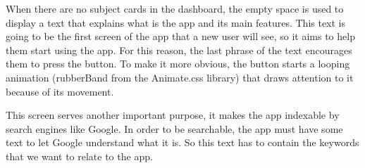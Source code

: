 When there are no subject cards in the dashboard, the empty space is used to display a text that explains what is the app and its main features. This text is going to be the first screen of the app that a new user will see, so it aims to help them start using the app. For this reason, the last phrase of the text encourages them to press the  button. To make it more obvious, the  button starts a looping animation (rubberBand from the Animate.css\cite{animate-css} library) that draws attention to it because of its movement.

This screen serves another important purpose, it makes the app indexable by search engines like Google. In order to be searchable, the app must have some text to let Google understand what it is. So this text has to contain the keywords that we want to relate to the app.

